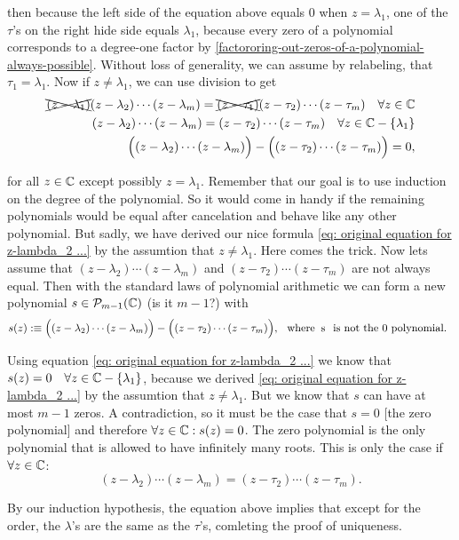 \begin{prf}
  then because the left side of the equation above equals $0$ when $z=\lambda_1$, one of the $\tau$'s on the right hide side equals $\lambda_1$, because every zero of a polynomial corresponds to a degree-one factor by \ref{factororing-out-zeros-of-a-polynomial-always-possible}. Without loss of generality, we can assume by relabeling, that $\tau_1 = \lambda_1$. Now if $z \neq \lambda_1$, we can use division to get
  \begin{equation}
    \label{eq: original equation for z-lambda_2 ...}
    \begin{aligned}
      \xcancel{(z - \lambda_1)} (z - \lambda_2) \cdots (z-\lambda_m) = \xcancel{(z-\tau_1)} (z-\tau_2) \cdots (z-\tau_m) \quad \forall z \in \mathbb{C} \\
      (z - \lambda_2) \cdots (z-\lambda_m) = (z-\tau_2) \cdots (z-\tau_m) \quad \forall z \in \mathbb{C} - \{ \lambda_1 \} \\
      \Big((z - \lambda_2) \cdots (z-\lambda_m) \Big) -   \Big((z-\tau_2) \cdots (z-\tau_m)\Big) = 0,
    \end{aligned}
  \end{equation}

  for all $z \in \mathbb{C}$ except possibly $z = \lambda_1$. Remember that our goal is to use induction on the degree of the polynomial. So it would come in handy if the remaining polynomials would be equal after cancelation and behave like any other polynomial. But sadly, we have derived our nice formula \eqref{eq: original equation for z-lambda_2 ...} by the assumtion that $z \neq \lambda_1$. Here comes the trick. Now lets assume that $(z - \lambda_2) \cdots (z-\lambda_m)$ and $(z - \tau_2) \cdots (z-\tau_m)$ are not always equal. Then with the standard laws of polynomial arithmetic we can form a new polynomial $s \in \mathcal{P}_{m-1}(\mathbb{C})$ (is it $m-1$?) with
  \begin{equation}
    s(z) :\equiv   \Big((z - \lambda_2) \cdots (z-\lambda_m)\Big) - \Big((z-\tau_2) \cdots (z-\tau_m)\Big), \mytext{where} $s$ \mytext{is not the $0$ polynomial.}
  \end{equation}

   Using equation \eqref{eq: original equation for z-lambda_2 ...} we know that $s(z) = 0 \quad \forall z \in \mathbb{C} - \{\lambda_1\}$, because we derived \eqref{eq: original equation for z-lambda_2 ...} by the assumtion that $z \neq \lambda_1$. But we know that $s$ can have at most $m-1$ zeros. A contradiction, so it must be the case that $s = 0$ [the zero polynomial] and therefore $\forall z \in \mathbb{C}: s(z) = 0$. The zero polynomial is the only polynomial that is allowed to have infinitely many roots. This is only the case if $\forall z \in \mathbb{C}$:
   \[
    (z - \lambda_2) \cdots (z-\lambda_m) = (z - \tau_2) \cdots (z-\tau_m).
   \]

   By our induction hypothesis, the equation above implies that except for the order, the $\lambda$'s are the same as the $\tau$'s, comleting the proof of uniqueness.
\end{prf}

